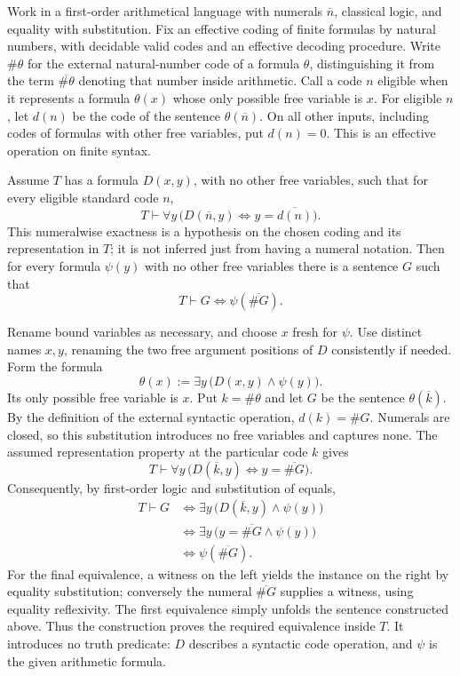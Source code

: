 \begin{lemma}
Work in a first-order arithmetical language with numerals $\overline n$,
classical logic, and equality with substitution. Fix an effective coding
of finite formulas by natural numbers, with decidable valid codes and
an effective decoding procedure. Write $\#\theta$ for the external
natural-number code of a formula $\theta$, distinguishing it from the
term $\overline{\#\theta}$ denoting that number inside arithmetic.
Call a code $n$ eligible when it represents a formula $\theta(x)$
whose only possible free variable is $x$. For eligible $n$, let $d(n)$
be the code of the sentence $\theta(\overline n)$. On all other inputs,
including codes of formulas with other free variables, put $d(n)=0$.
This is an effective operation on finite syntax.

Assume $T$ has a formula $D(x,y)$, with no other free variables, such
that for every eligible standard code $n$,
\[
T\vdash\forall y\,
 \bigl(D(\overline n,y)\iff y=\overline{d(n)}\bigr).
\]
This numeralwise exactness is a hypothesis on the chosen coding and its
representation in $T$; it is not inferred just from having a numeral
notation. Then for every formula $\psi(y)$ with no other free variables
there is a sentence $G$ such that
\[
T\vdash G\iff\psi(\overline{\#G}).
\]
\end{lemma}
\Proof
Rename bound variables as necessary, and choose $x$ fresh for $\psi$.
Use distinct names $x,y$, renaming the two free argument positions of
$D$ consistently if needed. Form the formula
\[
\theta(x):=\exists y\,\bigl(D(x,y)\land\psi(y)\bigr).
\]
Its only possible free variable is $x$. Put $k=\#\theta$ and let
$G$ be the sentence $\theta(\overline k)$. By the definition of the
external syntactic operation, $d(k)=\#G$. Numerals are closed, so
this substitution introduces no free variables and captures none.
The assumed representation property at the particular code $k$ gives
\[
T\vdash\forall y\,
 \bigl(D(\overline k,y)\iff y=\overline{\#G}\bigr).
\]
Consequently, by first-order logic and substitution of equals,
\[
\begin{aligned}
T\vdash G
&\iff\exists y\,\bigl(D(\overline k,y)\land\psi(y)\bigr)\\
&\iff\exists y\,\bigl(y=\overline{\#G}\land\psi(y)\bigr)\\
&\iff\psi(\overline{\#G}).
\end{aligned}
\]
For the final equivalence, a witness on the left yields the instance
on the right by equality substitution; conversely the numeral
$\overline{\#G}$ supplies a witness, using equality reflexivity.
The first equivalence simply unfolds the sentence constructed above.
Thus the construction proves the required equivalence inside $T$.
It introduces no truth predicate: $D$ describes a syntactic code
operation, and $\psi$ is the given arithmetic formula.
\Done

